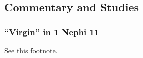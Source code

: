 	


	
	
	
	
\subsection{Commentary and Studies} %
	\label{VIRGIN-COMMENTARY}

	
		
	\subsubsection{``Virgin'' in 1 Nephi 11}
		\label{VIRGIN-study}
		
		See \hyperref[1NEPHI-11-13-NOTE-virgin]{this footnote}.